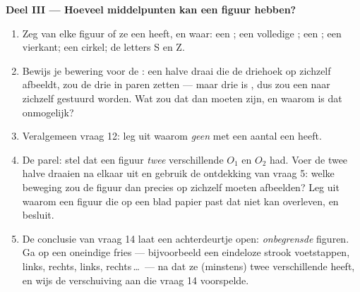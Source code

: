 \begin{problem}
\medskip
\noindent\textbf{Deel III --- Hoeveel middelpunten kan een figuur hebben?}
\begin{enumerate}[resume]
  \item Zeg van elke figuur of ze een  heeft, en waar: een
        ; een volledige ; een ; een vierkant; een
        cirkel; de letters S en Z.
  \item Bewijs je bewering voor de : een halve draai die de
        driehoek op zichzelf afbeeldt, zou de drie  in paren zetten ---
        maar drie is , dus zou een  naar zichzelf gestuurd worden. Wat
        zou dat  dan moeten zijn, en waarom is dat onmogelijk?
  \item Veralgemeen vraag 12: leg uit waarom \emph{geen}  met een 
        aantal  een  heeft.
  \item De parel: stel dat een figuur \emph{twee} verschillende
         $O_1$ en $O_2$ had. Voer de twee halve draaien na
        elkaar uit en gebruik de ontdekking van vraag 5: welke beweging zou de figuur
        dan precies op zichzelf moeten afbeelden? Leg uit waarom een figuur die op een
        blad papier past dat niet kan overleven, en besluit.
  \item De conclusie van vraag 14 laat een achterdeurtje open: \emph{onbegrensde}
        figuren. Ga op een oneindige fries --- bijvoorbeeld een eindeloze strook
        voetstappen, links, rechts, links, rechts\,\dots\ --- na dat ze (minstens)
        twee verschillende  heeft, en wijs de verschuiving aan
        die vraag 14 voorspelde.
\end{enumerate}
\end{problem}
